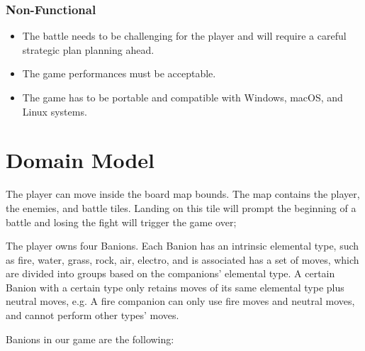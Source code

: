 \documentclass[12pt, a4paper]{report}
\begin{document}
\subsubsection{Non-Functional}

\begin{itemize}
    \item The battle needs to be challenging for the player and will require a careful strategic plan planning ahead. \label{challengingbattle}
    \item The game performances must be acceptable.
    \item The game has to be portable and compatible with Windows, macOS, and Linux systems.
\end{itemize}

\section{Domain Model}

    The player can move inside the board map bounds. The map contains the player, the enemies, and battle tiles.
    Landing on this tile will prompt the beginning of a battle and losing the fight will trigger the game over;

    The player owns four Banions. Each Banion has an intrinsic elemental type, such as fire, water, grass, rock, air, electro,
    and is associated has a set of moves, which are divided into groups based on the companions' elemental type. A certain Banion with a certain
    type only retains moves of its same elemental type plus neutral moves, e.g. A fire companion can only use fire moves and neutral moves,
    and cannot perform other types' moves.

    Banions in our game are the following:
\end{document}
